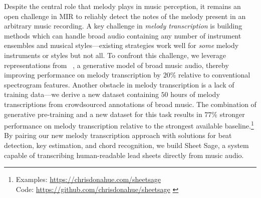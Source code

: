Despite the central role that melody plays in music perception, 
it remains an open challenge in MIR to reliably detect the notes of the melody present in an arbitrary music recording. 
A key challenge in \emph{melody transcription} is building methods which can handle broad audio containing any number of instrument ensembles and musical styles---existing strategies work well for \emph{some} melody instruments or styles but not all. 
To confront this challenge, we leverage representations from \jukebox{}~\cite{dhariwal2020jukebox}, 
a generative model of broad music audio, 
thereby improving performance on melody transcription by 
$20$\% 
relative to conventional spectrogram features. 
Another obstacle in melody transcription is a lack of training data---we derive a new dataset containing $50$ hours of melody transcriptions from crowdsourced annotations of broad music. 
The combination of generative pre-training and a new dataset for this task results in 
$77\%$ stronger performance on melody transcription relative to the strongest available baseline.\footnote{Examples: \url{https://chrisdonahue.com/sheetsage} \\
Code: \url{https://github.com/chrisdonahue/sheetsage}
\label{sound_examples}} 
By pairing our new melody transcription approach with solutions for beat detection, key estimation, and chord recognition, 
we build Sheet Sage, a system capable of transcribing human-readable lead sheets directly from music audio.
